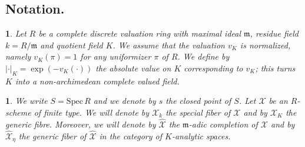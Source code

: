 \documentclass{amsart}%
\numberwithin{equation}{subsection}
\theoremstyle{plain2}
\theoremstyle{definition2}
\theoremstyle{stepstyle}
\theoremstyle{point}
\theoremstyle{subpoint}
\newtheorem{subpoint}[equation]{}%
\newcommand{\spa}[1]{\begin{subpoint}#1\end{subpoint}}           %
\newcommand{\cX}{\ensuremath{\mathscr{X}}}
\newcommand{\mm}{\ensuremath{\mathfrak{m}}}
\newcommand{\Spec}{\ensuremath{\mathrm{Spec}\,}}
\begin{document}
%
%

\subsection{Notation.}
\spa{Let $R$ be a complete discrete valuation ring with maximal ideal $\mm$, residue field $k=R/\mm$ and quotient field $K$. We assume that the valuation $v_K$ is normalized, namely $v_K(\pi)=1$ for any uniformizer $\pi$ of $R$. We define by $|\cdot|_K= \exp(- v_K(\cdot))$ the absolute value on $K$ corresponding to $v_K$; this turns $K$ into a non-archimedean complete valued field.}
\spa{ We write $S=\Spec R$ and we denote by $s$ the closed point of $S$. Let $\cX$ be an $R$-scheme of finite type. We will denote by $\cX_k$ the special fiber of $\cX$ and by $\cX_K$ the generic fibre. Moreover, we will denote by $\widehat{\cX}$ the $\mm$-adic completion of $\cX$ and by $\widehat{\cX}_\eta$ the generic fiber of $\widehat{\cX}$ in the category of $K$-analytic spaces.}
\end{document}
